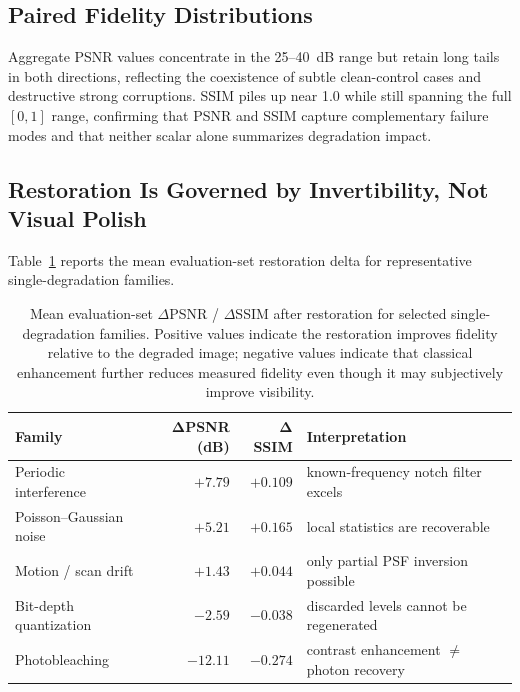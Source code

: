 \documentclass[11pt]{article}
\begin{document}
\subsection{Paired Fidelity Distributions}

Aggregate PSNR values concentrate in the 25--40~dB range but retain long tails in both
directions, reflecting the coexistence of subtle clean-control cases and destructive
strong corruptions. SSIM piles up near 1.0 while still spanning the full $[0,1]$ range,
confirming that PSNR and SSIM capture complementary failure modes and that neither
scalar alone summarizes degradation impact.

\subsection{Restoration Is Governed by Invertibility, Not Visual Polish}

Table~\ref{tab:restoration_delta} reports the mean evaluation-set restoration delta for
representative single-degradation families.

\begin{table}[h]
\centering
\small
\begin{tabular}{@{}l r r l@{}}
\toprule
\textbf{Family} & $\boldsymbol{\Delta}$\textbf{PSNR (dB)} & $\boldsymbol{\Delta}$\textbf{SSIM} & \textbf{Interpretation} \\
\midrule
Periodic interference & $+7.79$ & $+0.109$ & known-frequency notch filter excels \\
Poisson--Gaussian noise & $+5.21$ & $+0.165$ & local statistics are recoverable \\
Motion / scan drift & $+1.43$ & $+0.044$ & only partial PSF inversion possible \\
Bit-depth quantization & $-2.59$ & $-0.038$ & discarded levels cannot be regenerated \\
Photobleaching & $-12.11$ & $-0.274$ & contrast enhancement $\neq$ photon recovery \\
\bottomrule
\end{tabular}
\caption{Mean evaluation-set $\Delta$PSNR / $\Delta$SSIM after restoration for
selected single-degradation families. Positive values indicate the restoration
improves fidelity relative to the degraded image; negative values indicate that
classical enhancement further reduces measured fidelity even though it may
subjectively improve visibility.}
\label{tab:restoration_delta}
\end{table}
\end{document}

